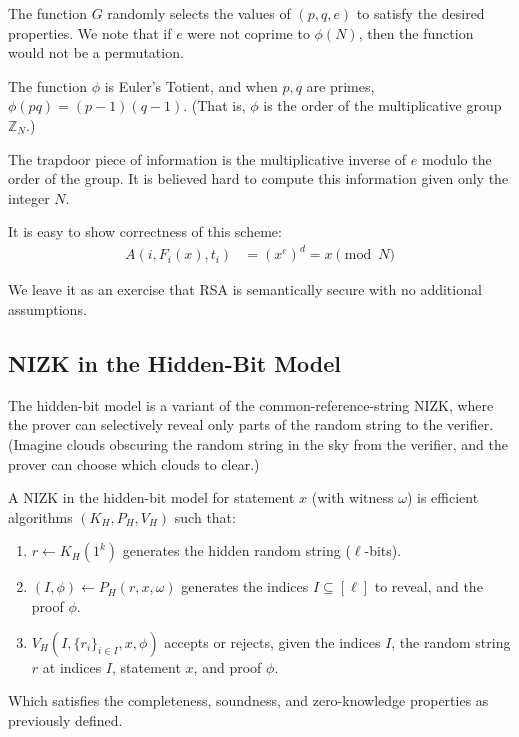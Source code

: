\documentclass[12pt]{tufte-book}
\begin{document}
The function $G$ randomly selects the values of $(p, q, e)$ to satisfy the desired properties. We note that if  $e$ were not coprime to $\phi(N)$, then the function would
not be a permutation.

The function $\phi$ is Euler's Totient, and when $p,q$ are primes,
$\phi(pq) = (p-1)(q-1)$.
(That is, $\phi$ is the order of the multiplicative group $\mathbb{Z}_N$.)

The trapdoor piece of information is the multiplicative inverse of $e$ modulo the order of the
group. It is believed hard to compute this information given only the integer $N$.

It is easy to show correctness of this scheme:
\begin{align*}
A(i, F_i(x), t_i) &= (x^e)^d = x \pmod{N}
\end{align*}

We leave it as an exercise that RSA is semantically
secure with no additional assumptions.

\subsection{NIZK in the Hidden-Bit Model}
The hidden-bit model is a variant of the common-reference-string NIZK,
where the prover can selectively reveal only parts of the random string to the
verifier. (Imagine clouds obscuring the random string in the sky from the
verifier, and the prover can choose which clouds to clear.)

\newcommand{\setI}[1]{\{#1\}_{i \in I}}
\begin{definition}
    A NIZK in the hidden-bit model for statement $x$ (with witness $\omega$)
    is efficient algorithms $(K_H, P_H, V_H)$
    such that:
\begin{enumerate}
    \item $r \gets K_H(1^k)$ generates the hidden random string ($\ell$-bits).
    \item $(I, \phi) \gets P_H(r, x, \omega)$ generates the indices $I \subseteq
        [\ell]$ to reveal, and the proof $\phi$.
    \item $V_H(I, \setI{r_i}, x, \phi)$ accepts or rejects, given the indices $I$,
        the random string $r$ at indices $I$, statement $x$, and proof $\phi$.
\end{enumerate}
Which satisfies the completeness, soundness, and zero-knowledge properties as
previously defined.
\end{definition}
\end{document}

